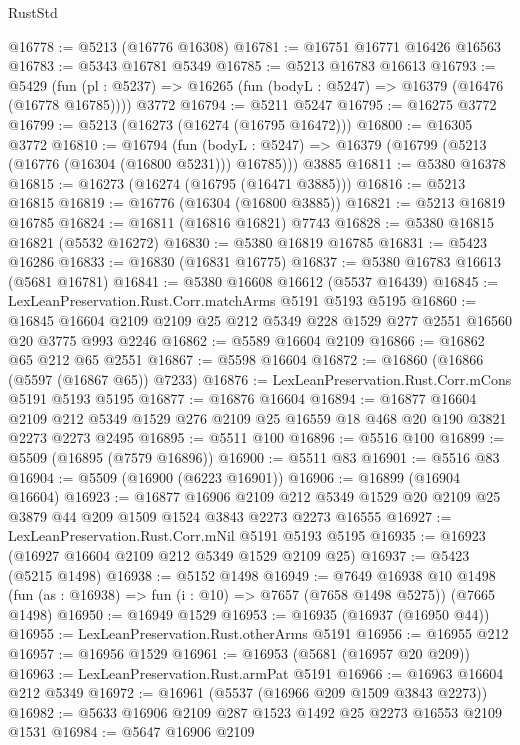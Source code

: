 \begin{lexlean}{RustStd}
\begin{coremodule}
@16778 := @5213 (@16776 @16308)
@16781 := @16751 @16771 @16426 @16563
@16783 := @5343 @16781 @5349
@16785 := @5213 @16783 @16613
@16793 := @5429
    (fun (pl : @5237) => @16265 (fun (bodyL : @5247) => @16379 (@16476 (@16778 @16785))))
    @3772
@16794 := @5211 @5247
@16795 := @16275 @3772
@16799 := @5213 (@16273 (@16274 (@16795 @16472)))
@16800 := @16305 @3772
@16810 := @16794
    (fun (bodyL : @5247) => @16379 (@16799 (@5213 (@16776 (@16304 (@16800 @5231))) @16785)))
    @3885
@16811 := @5380 @16378
@16815 := @16273 (@16274 (@16795 (@16471 @3885)))
@16816 := @5213 @16815
@16819 := @16776 (@16304 (@16800 @3885))
@16821 := @5213 @16819 @16785
@16824 := @16811 (@16816 @16821) @7743
@16828 := @5380 @16815 @16821 (@5532 @16272)
@16830 := @5380 @16819 @16785
@16831 := @5423 @16286
@16833 := @16830 (@16831 @16775)
@16837 := @5380 @16783 @16613 (@5681 @16781)
@16841 := @5380 @16608 @16612 (@5537 @16439)
@16845 := LexLeanPreservation.Rust.Corr.matchArms @5191 @5193 @5195
@16860 := @16845 @16604 @2109 @2109 @25 @212 @5349 @228 @1529 @277 @2551 @16560 @20 @3775 @993 @2246
@16862 := @5589 @16604 @2109
@16866 := @16862 @65 @212 @65 @2551
@16867 := @5598 @16604
@16872 := @16860 (@16866 (@5597 (@16867 @65)) @7233)
@16876 := LexLeanPreservation.Rust.Corr.mCons @5191 @5193 @5195
@16877 := @16876 @16604
@16894 := @16877
    @16604
    @2109
    @212
    @5349
    @1529
    @276
    @2109
    @25
    @16559
    @18
    @468
    @20
    @190
    @3821
    @2273
    @2273
    @2495
@16895 := @5511 @100
@16896 := @5516 @100
@16899 := @5509 (@16895 (@7579 @16896))
@16900 := @5511 @83
@16901 := @5516 @83
@16904 := @5509 (@16900 (@6223 @16901))
@16906 := @16899 (@16904 @16604)
@16923 := @16877
    @16906
    @2109
    @212
    @5349
    @1529
    @20
    @2109
    @25
    @3879
    @44
    @209
    @1509
    @1524
    @3843
    @2273
    @2273
    @16555
@16927 := LexLeanPreservation.Rust.Corr.mNil @5191 @5193 @5195
@16935 := @16923 (@16927 @16604 @2109 @212 @5349 @1529 @2109 @25)
@16937 := @5423 (@5215 @1498)
@16938 := @5152 @1498
@16949 := @7649
    @16938
    @10
    @1498
    (fun (as : @16938) => fun (i : @10) => @7657 (@7658 @1498 @5275))
    (@7665 @1498)
@16950 := @16949 @1529
@16953 := @16935 (@16937 (@16950 @44))
@16955 := LexLeanPreservation.Rust.otherArms @5191
@16956 := @16955 @212
@16957 := @16956 @1529
@16961 := @16953 (@5681 (@16957 @20 @209))
@16963 := LexLeanPreservation.Rust.armPat @5191
@16966 := @16963 @16604 @212 @5349
@16972 := @16961 (@5537 (@16966 @209 @1509 @3843 @2273))
@16982 := @5633 @16906 @2109 @287 @1523 @1492 @25 @2273 @16553 @2109 @1531
@16984 := @5647 @16906 @2109

\end{coremodule}
\end{lexlean}
